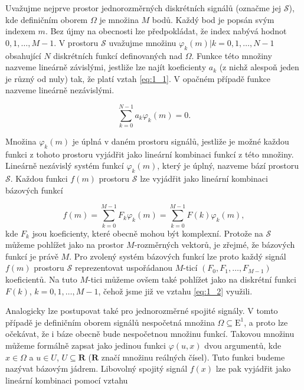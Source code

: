 Uvažujme nejprve prostor jednorozměrných diskrétních signálů (označme jej $\mathscr{S}$), kde definičním oborem $\Omega$ je množina $M$ bodů.
Každý bod je popsán svým indexem $m$. Bez újmy na obecnosti lze předpokládat, že index nabývá hodnot $0, 1, \dots, M-1$.
V prostoru $\mathscr{S}$ uvažujme množinu ${\varphi_k(m) | k = 0, 1, \dots, N-1}$ obsahující $N$ diskrétních funkcí definovaných nad $\Omega$.
Funkce této množiny nazveme lineárně závislými, jestliže lze najít koeficienty $a_k$ (z nichž alespoň jeden je různý od nuly) tak, že platí vztah \eqref{eq:1_1}.
V opačném případě funkce nazveme lineárně nezávislými.

\begin{equation} \label{eq:1_1}
    \sum\limits_{k=0}^{N-1} a_k \varphi_k (m) = 0.
\end{equation}

Množina ${\varphi_k(m)}$ je úplná v daném prostoru signálů, jestliže je možné každou funkci z tohoto prostoru vyjádřit jako lineární kombinaci funkcí z této množiny.
Lineárně nezávislý systém funkcí ${\varphi_k(m)}$, který je úplný, nazveme bází prostoru $\mathscr{S}$. Každou funkci $f(m)$ prostoru $\mathscr{S}$ lze vyjádřit jako lineární kombinaci bázových funkcí

\begin{equation} \label{eq:1_2}
    f(m) = \sum\limits_{k=0}^{M-1} F_k \varphi_k (m) = \sum\limits_{k=0}^{M-1} F(k) \varphi_k (m),
\end{equation}
kde $F_k$ jsou koeficienty, které obecně mohou být komplexní. Protože na $\mathscr{S}$ můžeme pohlížet jako na prostor $M$-rozměrných vektorů, je zřejmé, že bázových funkcí je právě $M$.
Pro zvolený systém bázových funkcí lze proto každý signál $f(m)$ prostoru $\mathscr{S}$ reprezentovat uspořádanou $M$-ticí $(F_0, F_1, \dots, F_{M-1})$ koeficientů.
Na tuto $M$-tici můžeme ovšem také pohlížet jako na diskrétní funkci $F(k)$, $k = 0, 1, \dots, M-1$, čehož jsme již ve vztahu \eqref{eq:1_2} využili.

Analogicky lze postupovat také pro jednorozměrné spojité signály. V tomto případě je definičním oborem signálů nespočetná množina $\Omega \subseteq \mathrm{E}^1$,
a proto lze očekávat, že i báze obecně bude nespočetnou množinu funkcí. Takovou množinu můžeme formálně zapsat jako jedinou funkci $\varphi(u,x)$ dvou argumentů,
kde $x \in \Omega$ a $u\in U$, $U \subseteq \mathbf{R}$ ($\mathbf{R}$ značí množinu reálných čísel). Tuto funkci budeme nazývat bázovým jádrem. Libovolný spojitý signál $f(x)$ lze pak vyjádřit jako lineární kombinaci pomocí vztahu

